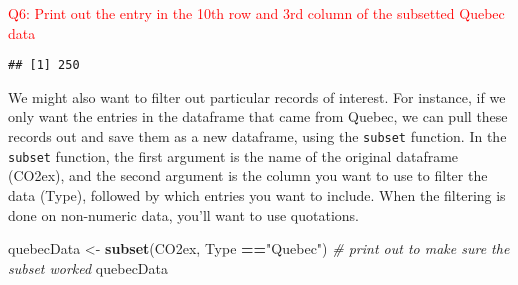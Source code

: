 \documentclass[]{article}
\newenvironment{Shaded}{\begin{snugshade}}{\end{snugshade}}
\newcommand{\CommentTok}[1]{\textcolor[rgb]{0.56,0.35,0.01}{\textit{#1}}}
\newcommand{\DecValTok}[1]{\textcolor[rgb]{0.00,0.00,0.81}{#1}}
\newcommand{\KeywordTok}[1]{\textcolor[rgb]{0.13,0.29,0.53}{\textbf{#1}}}
\newcommand{\NormalTok}[1]{#1}
\newcommand{\OperatorTok}[1]{\textcolor[rgb]{0.81,0.36,0.00}{\textbf{#1}}}
\newcommand{\StringTok}[1]{\textcolor[rgb]{0.31,0.60,0.02}{#1}}
\begin{document}
\textcolor{red}{Q6: Print out the entry in the 10th row and 3rd column of the subsetted Quebec data}

\begin{Shaded}
\end{Shaded}

\begin{verbatim}
## [1] 250
\end{verbatim}

We might also want to filter out particular records of interest. For
instance, if we only want the entries in the dataframe that came from
Quebec, we can pull these records out and save them as a new dataframe,
using the \texttt{subset} function. In the \texttt{subset} function, the
first argument is the name of the original dataframe (CO2ex), and the
second argument is the column you want to use to filter the data (Type),
followed by which entries you want to include. When the filtering is
done on non-numeric data, you'll want to use quotations.

\begin{Shaded}
\begin{Highlighting}[]
\NormalTok{quebecData <-}\StringTok{ }\KeywordTok{subset}\NormalTok{(CO2ex, Type }\OperatorTok{==}\StringTok{"Quebec"}\NormalTok{)}
\CommentTok{# print out to make sure the subset worked}
\NormalTok{quebecData}
\end{Highlighting}
\end{Shaded}
\end{document}
